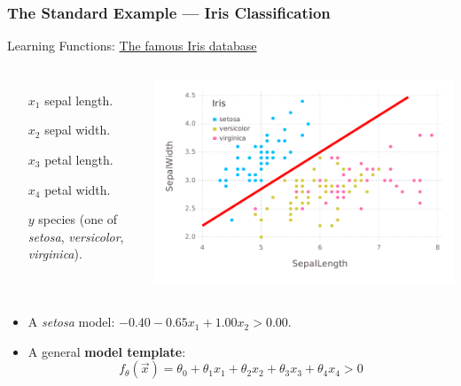 \documentclass[bigger,xcolor={x11names,svgnames}]{beamer}
\begin{document}
\begin{frame}
    \frametitle{The Standard Example --- Iris Classification}
    \small
    \begin{center}
        Learning Functions: \href{https://en.wikipedia.org/wiki/Iris_flower_data_set}{The famous Iris database}
    \end{center}
    \begin{columns}
        \begin{itemize}\setlength{\itemsep}{-0.5em}
            \item[$x_1$] sepal length.
            \item[$x_2$] sepal width.
            \item[$x_3$] petal length.
            \item[$x_4$] petal width.
            \item[$y$] species (one of \emph{setosa}, \emph{versicolor}, \emph{virginica}).
        \end{itemize}
        \begin{center}
            \includegraphics[width=\textwidth]{iris_plot.pdf}
        \end{center}
    \end{columns}
    \vfill
    \begin{itemize}
        \item A \emph{setosa} model: $ - 0.40 -0.65x_1 + 1.00x_2  > 0.00$.
        \item A general \textbf{model template}:
              $$
                  f_\theta(\vec{x}) = \theta_0 + \theta_1 x_1 + \theta_2 x_2 + \theta_3 x_3 + \theta_4 x_4> 0
              $$
    \end{itemize}
\end{frame}
\end{document}
